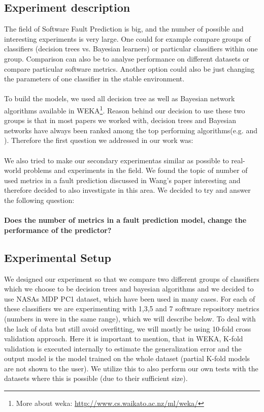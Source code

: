 \subsection{Experiment description}
The field of Software Fault Prediction is big, and the number of possible and interesting experiments is very large. One could for example compare groups of classifiers (decision trees vs. Bayesian learners) or particular classifiers within one group. Comparison can also be to analyse performance on different datasets or compare particular software metrics. Another option could also be just changing the parameters of one classifier in the stable environment.\\\\
To build the models, we used all decision tree as well as Bayesian network algorithms available in WEKA\footnote{More about weka: \url{http://www.cs.waikato.ac.nz/ml/weka/}}. Reason behind our decision to use these two groups is that in most papers we worked with, decision trees and Bayesian networks have always been ranked among the top performing algorithms(e.g. \cite{malhotra2015systematic} and \cite{shivaji2009reducing}). Therefore the first question we addressed in our work was: \\\\

We also tried to make our secondary experimentas similar as possible to real-world problems and experiments in the field. We found the topic of number of used metrics in a fault prediction discussed in Wang's paper\cite{wang2011many} interesting and therefore decided to also investigate in this area. We decided to try and answer the following question:\\\\
\textbf{Does the number of metrics in a fault prediction model, change the performance of the predictor?}\\

\subsection{Experimental Setup}
We designed our experiment so that we compare two different groups of classifiers which we choose to be decision trees and bayesian algorithms and we decided to use NASAs MDP PC1 dataset, which have been used in many cases. For each of these classifiers we are experimenting with 1,3,5 and 7 software repository metrics (numbers in \cite{wang2011many} were in the same range), which we will describe below. To deal with the lack of data but still avoid overfitting, we will mostly be using 10-fold cross validation approach. Here it is important to mention, that in WEKA, K-fold validation is executed internally to estimate the generalization error and the output model is the model trained on the whole dataset (partial K-fold models are not shown to the user). We utilize this to also perform our own tests with the datasets where this is possible (due to their sufficient size).
